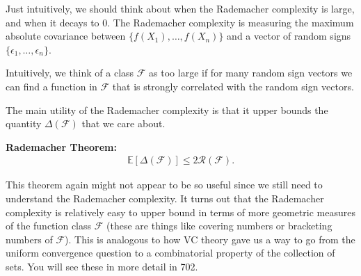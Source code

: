 \documentclass[twoside,12pt]{article}
\begin{document}
Just intuitively, we should think about when the Rademacher complexity is large, and when it decays to 0. The Rademacher complexity is measuring the maximum absolute covariance between 
$\{f(X_1),\ldots,f(X_n)\}$ and a vector of random signs $\{\epsilon_1,\ldots,\epsilon_n \}$.

Intuitively, we think of a class $\mathcal{F}$ as too large if for many random sign vectors we can find a function in $\mathcal{F}$ that is strongly correlated with the random sign vectors.

The main utility of the Rademacher complexity is that it upper bounds the quantity $\Delta(\mathcal{F})$ that we care about. 

{\bf Rademacher Theorem: } 
\begin{align*}
\mathbb{E}[\Delta(\mathcal{F})] \leq 2 \mathcal{R}(\mathcal{F}).
\end{align*}

This theorem again might not appear to be so useful since we still need to understand the Rademacher complexity. 
It turns out that the Rademacher complexity is relatively easy to upper bound in terms of more geometric measures of the function class $\mathcal{F}$ (these are things like covering numbers or bracketing numbers of $\mathcal{F}$). This is analogous to how VC theory gave us a way to go from the uniform convergence question to a combinatorial property of the collection of sets. You will see these in more detail in 702.
\end{document}
